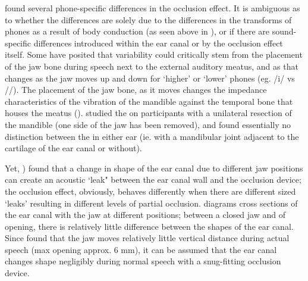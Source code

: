 \cite{hansen:97b} found several phone-specific differences in the occlusion effect\DIFdelbegin {}\DIFdelend . It is ambiguous as to whether the differences are solely due to the differences in the transforms of phones as a result of body conduction (as seen above in \cite{reinfeldt:10}), or if there are sound-specific differences introduced within the ear canal or by the occlusion effect itself.  
Some have posited that variability could critically stem from the placement of the jaw bone during speech next to the external auditory meatus, and as that changes as the jaw moves up and down for `higher' or `lower' phones (eg. /i/ vs /\DIFdelbegin {}\DIFdelend \DIFaddbegin {}\DIFaddend /). The placement of the jaw bone, as it moves changes the impedance characteristics of the vibration of the mandible against the temporal bone that houses the meatus (\cite{bekesy:60}).  \cite{allen:60} studied the \DIFdelbegin {}\DIFdelend \DIFaddbegin {}\DIFaddend on participants with a unilateral resection of the mandible (one side of the jaw has been removed), and found essentially no distinction between the \DIFdelbegin {}\DIFdelend \DIFaddbegin {}\DIFaddend in either ear (ie. with a mandibular joint adjacent to the cartilage of the ear canal or without).

Yet, \cite{hansen:97b}) found that a change in shape of the ear canal due to different jaw positions can create an acoustic `leak" between the ear canal wall and the occlusion device; the occlusion effect, obviously, behaves differently when there are different sized `leaks' resulting in different levels of partial occlusion. 
\cite{hansen:97b} diagrams cross sections of the ear canal with the jaw at different positions; between a closed jaw and \DIFdelbegin \DIFdel{5mm }\DIFdelend \DIFaddbegin \DIFadd{5 mm }\DIFaddend of opening, there is relatively little difference between the shapes of the ear canal.  Since \cite{borghese:97} found that the jaw moves relatively little vertical distance during actual speech (max opening approx. 6 mm), it can be assumed that the ear canal changes shape negligibly during normal speech with a snug-fitting occlusion device. 

